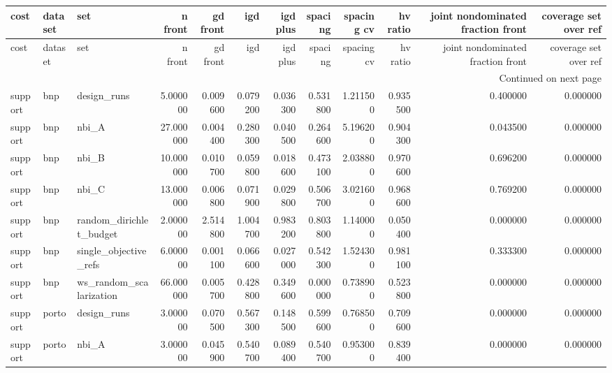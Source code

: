 \begin{landscape}
\begin{center}\label{tab:s4ind}\end{center}
\begingroup\tiny\setlength{\tabcolsep}{2.5pt}
\begin{longtable}{lllrrrrrrrrr}
\toprule
cost & dataset & set & n front & gd front & igd & igd plus & spacing & spacing cv & hv ratio & joint nondominated fraction front & coverage set over ref \\
\midrule
\endfirsthead
\toprule
cost & dataset & set & n front & gd front & igd & igd plus & spacing & spacing cv & hv ratio & joint nondominated fraction front & coverage set over ref \\
\midrule
\endhead
\midrule
\multicolumn{12}{r}{Continued on next page} \\
\midrule
\endfoot
\bottomrule
\endlastfoot
support & bnp & design\_runs & 5.000000 & 0.009600 & 0.079200 & 0.036300 & 0.531800 & 1.211500 & 0.935500 & 0.400000 & 0.000000 \\
support & bnp & nbi\_A & 27.000000 & 0.004400 & 0.280300 & 0.040500 & 0.264600 & 5.196200 & 0.904300 & 0.043500 & 0.000000 \\
support & bnp & nbi\_B & 10.000000 & 0.010700 & 0.059800 & 0.018600 & 0.473100 & 2.038800 & 0.970600 & 0.696200 & 0.000000 \\
support & bnp & nbi\_C & 13.000000 & 0.006800 & 0.071900 & 0.029800 & 0.506700 & 3.021600 & 0.968600 & 0.769200 & 0.000000 \\
support & bnp & random\_dirichlet\_budget & 2.000000 & 2.514800 & 1.004700 & 0.983200 & 0.803800 & 1.140000 & 0.050400 & 0.000000 & 0.000000 \\
support & bnp & single\_objective\_refs & 6.000000 & 0.001100 & 0.066600 & 0.027000 & 0.542300 & 1.524300 & 0.981100 & 0.333300 & 0.000000 \\
support & bnp & ws\_random\_scalarization & 66.000000 & 0.005700 & 0.428800 & 0.349600 & 0.000000 & 0.738900 & 0.523800 & 0.000000 & 0.000000 \\
support & porto & design\_runs & 3.000000 & 0.070500 & 0.567300 & 0.148500 & 0.599600 & 0.768500 & 0.709600 & 0.000000 & 0.000000 \\
support & porto & nbi\_A & 3.000000 & 0.045900 & 0.540700 & 0.089400 & 0.540700 & 0.953000 & 0.839400 & 0.000000 & 0.000000 \\

\end{longtable}
\end{landscape}
